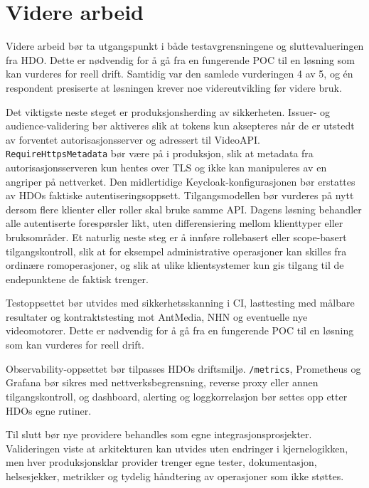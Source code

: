 \section{Videre arbeid}
\label{sec:videre-arbeid}

Videre arbeid bør ta utgangspunkt i både testavgrensningene og
sluttevalueringen fra HDO. Dette er nødvendig for å gå fra en fungerende POC til en løsning som kan vurderes for reell drift. Samtidig var den samlede
vurderingen 4 av 5, og én respondent presiserte at løsningen krever noe
videreutvikling før videre bruk.

Det viktigste neste steget er produksjonsherding av sikkerheten.
Issuer- og audience-validering bør aktiveres slik at tokens kun aksepteres når de
er utstedt av forventet autorisasjonsserver og adressert til VideoAPI. \texttt{RequireHttpsMetadata}
bør være på i produksjon, slik at
metadata fra autorisasjonsserveren kun hentes over TLS og ikke kan
manipuleres av en angriper på nettverket. Den midlertidige Keycloak-konfigurasjonen bør erstattes
av HDOs faktiske autentiseringsoppsett. Tilgangsmodellen bør vurderes på nytt dersom flere klienter eller roller skal
bruke samme API. Dagens løsning behandler alle autentiserte forespørsler
likt, uten differensiering mellom klienttyper eller bruksområder. Et naturlig
neste steg er å innføre rollebasert eller scope-basert tilgangskontroll, slik
at for eksempel administrative operasjoner kan skilles fra ordinære
romoperasjoner, og slik at ulike klientsystemer kun gis tilgang til de
endepunktene de faktisk trenger.

Testoppsettet bør utvides med sikkerhetsskanning i CI, lasttesting med
målbare resultater og kontraktstesting mot AntMedia, NHN og eventuelle nye
videomotorer. Dette er nødvendig for å gå fra en fungerende
POC til en løsning som kan vurderes for reell drift.

Observability-oppsettet bør tilpasses HDOs driftsmiljø. \texttt{/metrics},
Prometheus og Grafana bør sikres med nettverksbegrensning, reverse proxy
eller annen tilgangskontroll, og dashboard, alerting og loggkorrelasjon
bør settes opp etter HDOs egne rutiner.

Til slutt bør nye providere behandles som egne integrasjonsprosjekter.
Valideringen viste at arkitekturen kan utvides uten endringer i
kjernelogikken, men hver produksjonsklar provider trenger egne tester,
dokumentasjon, helsesjekker, metrikker og tydelig håndtering av
operasjoner som ikke støttes.